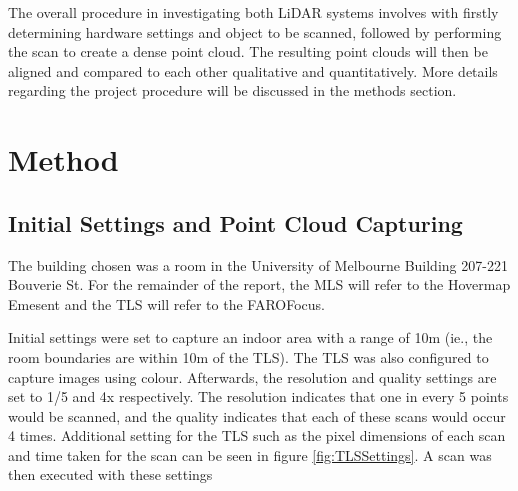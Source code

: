 \documentclass[man]{apa7}
\begin{document}
The overall procedure in investigating both LiDAR systems involves with firstly determining hardware settings and object to be scanned, followed by performing the scan to create a dense point cloud. The resulting point clouds will then be aligned and compared to each other qualitative and quantitatively. More details regarding the project procedure will be discussed in the methods section.

\section{Method}

\subsection{Initial Settings and Point Cloud Capturing}

The building chosen was a room in the University of Melbourne Building 207-221 Bouverie St. For the remainder of the report, the MLS will refer to the Hovermap Emesent and the TLS will refer to the FAROFocus.

Initial settings were set to capture an indoor area with a range of 10m (ie., the room boundaries are within 10m of the TLS). The TLS was also configured to capture images using colour. Afterwards, the resolution and quality settings are set to 1/5 and 4x respectively. The resolution indicates that one in every 5 points would be scanned, and the quality indicates that each of these scans would occur 4 times. Additional setting for the TLS such as the pixel dimensions of each scan and time taken 
for the scan can be seen in figure \ref{fig:TLSSettings}. A scan was then executed with these settings
\end{document}
